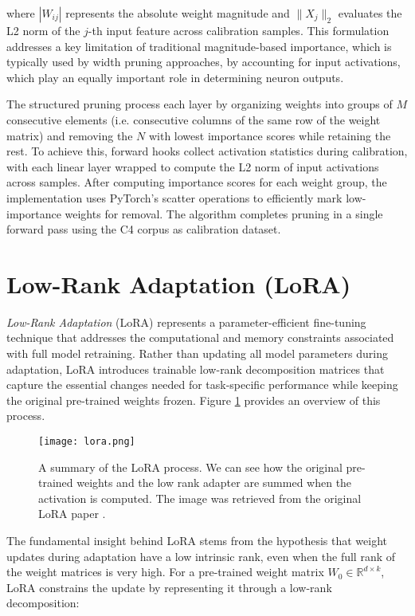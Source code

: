 where $|W_{ij}|$ represents the absolute weight magnitude and $\|X_j\|_2$ evaluates the L2 norm of the $j$-th input feature across calibration samples. This formulation addresses a key limitation of traditional magnitude-based importance, which is typically used by width pruning approaches, by accounting for input activations, which play an equally important role in determining neuron outputs.

The structured pruning process each layer by organizing weights into groups of $M$ consecutive elements (i.e. consecutive columns of the same row of the weight matrix) and removing the $N$ with lowest importance scores while retaining the rest. To achieve this, forward hooks collect activation statistics during calibration, with each linear layer wrapped to compute the L2 norm of input activations across samples. After computing importance scores for each weight group, the implementation uses PyTorch's scatter operations to efficiently mark low-importance weights for removal. The algorithm completes pruning in a single forward pass using the C4 corpus \cite{c4} as calibration dataset.

\section{Low-Rank Adaptation (LoRA)} \label{lora}

\textit{Low-Rank Adaptation} (LoRA) \cite{lora} represents a parameter-efficient fine-tuning technique that addresses the computational and memory constraints associated with full model retraining. Rather than updating all model parameters during adaptation, LoRA introduces trainable low-rank decomposition matrices that capture the essential changes needed for task-specific performance while keeping the original pre-trained weights frozen. Figure \ref{fig:lora} provides an overview of this process.

\begin{figure}[htbp]
    \centering
    \texttt{[image: lora.png]}
    \caption[LoRA Overview]{A summary of the LoRA process. We can see how the original pre-trained weights and the low rank adapter are summed when the activation is computed. The image was retrieved from the original LoRA paper \cite{lora}.}
    \label{fig:lora}
\end{figure}

The fundamental insight behind LoRA stems from the hypothesis that weight updates during adaptation have a low intrinsic rank, even when the full rank of the weight matrices is very high. For a pre-trained weight matrix $W_0 \in \mathbb{R}^{d \times k}$, LoRA constrains the update by representing it through a low-rank decomposition:

